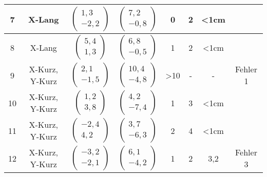 \begin{center}
\begin{longtable}{|c|c|c|c|c|c|c|c|}
		\hline
		7 & X-Lang &  $\left(\begin{array}{c} 1,3 \\ -2,2\end{array}\right)$ & $\left(\begin{array}{c} 7,2 \\ -0,8\end{array}\right)$ & 0& 2& <1cm& \checkmark\\
		\hline
		8 & X-Lang &  $\left(\begin{array}{c} 5,4 \\ 1,3\end{array}\right)$ & $\left(\begin{array}{c} 6,8 \\ -0,5\end{array}\right)$ & 1& 2& <1cm& \checkmark\\
		\hline
		9 & X-Kurz, Y-Kurz &  $\left(\begin{array}{c} 2,1 \\ -1,5\end{array}\right)$ & $\left(\begin{array}{c} 10,4 \\ -4,8\end{array}\right)$ & >10& -& -& Fehler 1\\
		\hline
		10 & X-Kurz, Y-Kurz &  $\left(\begin{array}{c} 1,2 \\ 3,8\end{array}\right)$ & $\left(\begin{array}{c} 4,2 \\ -7,4\end{array}\right)$ & 1& 3& <1cm& \checkmark\\
		\hline
		11 & X-Kurz, Y-Kurz &  $\left(\begin{array}{c} -2,4 \\ 4,2\end{array}\right)$ & $\left(\begin{array}{c} 3,7 \\ -6,3\end{array}\right)$ & 2& 4& <1cm& \checkmark\\
		\hline
		12 & X-Kurz, Y-Kurz &  $\left(\begin{array}{c} -3,2 \\ -2,1\end{array}\right)$ & $\left(\begin{array}{c} 6,1 \\ -4,2\end{array}\right)$ & 1& 2& 3,2& Fehler 3\\

\end{longtable}
\end{center}
